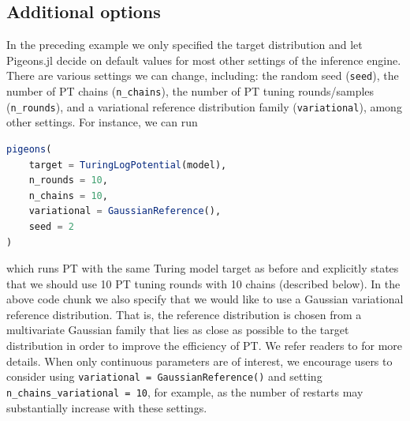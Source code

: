 \subsection{Additional options}
\label{sec:additional_options}
In the preceding example we only specified the target distribution and let 
Pigeons.jl decide on default values for most other settings of the inference engine. 
There are various settings we can change, including: 
the random seed (\texttt{seed}), the number of PT chains (\texttt{n\_chains}), 
the number of PT tuning rounds/samples (\texttt{n\_rounds}), 
and a variational reference distribution family (\texttt{variational}), among other settings.
For instance, we can run 
\begin{lstlisting}[language = Julia]
pigeons(
    target = TuringLogPotential(model),
    n_rounds = 10, 
    n_chains = 10,
    variational = GaussianReference(),
    seed = 2
)
\end{lstlisting}
which runs PT with the same Turing model target as before and explicitly states 
that we should use 10 PT tuning rounds with 10 chains (described below). 
In the above code chunk we also specify that we would like to use a 
Gaussian variational reference distribution.
That is, the reference distribution is chosen from a multivariate Gaussian family 
that lies as close as possible to the target distribution in order to improve 
the efficiency of PT. We refer readers to \cite{surjanovic2022vpt} for more details.
When only continuous parameters are of interest, we encourage users to consider 
using \texttt{variational = GaussianReference()} and setting \texttt{n\_chains\_variational = 10}, 
for example, as the number of restarts may substantially increase with these settings.

